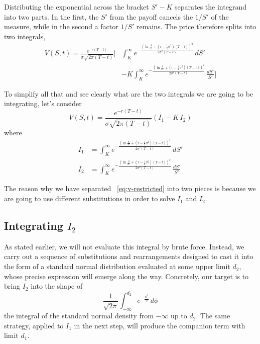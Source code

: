 \documentclass[a4paper,12pt]{article}
\numberwithin{equation}{section}
\begin{document}
Distributing the exponential across the bracket $S'-K$ separates the integrand
into two parts. In the first, the $S'$ from the payoff cancels the $1/S'$ of the
measure, while in the second a factor $1/S'$ remains. The price therefore splits
into two integrals,
\begin{equation}\label{eq:v-split-1}
\begin{aligned}
  V(S,t) = \frac{e^{-r(T-t)}}{\sigma\sqrt{2\pi(T-t)}}\Bigg[
    &\int_{K}^{\infty}
      e^{-\frac{\left(\ln\frac{S}{S'} + \left(r - \frac{1}{2}\sigma^2\right)(T-t)\right)^2}{2\sigma^2(T-t)}}
      \,dS' \\
    &- K\int_{K}^{\infty}
      e^{-\frac{\left(\ln\frac{S}{S'} + \left(r - \frac{1}{2}\sigma^2\right)(T-t)\right)^2}{2\sigma^2(T-t)}}
      \,\frac{dS'}{S'} \Bigg]
\end{aligned}
\end{equation}

To simplify all that and see clearly what are the two integrals we are going to be integrating, let's consider 
\begin{equation}\label{eq:v-split-2}
  V(S,t) = \frac{e^{-r(T-t)}}{\sigma\sqrt{2\pi(T-t)}}\left( I_1 - K\,I_2 \right)
\end{equation}
where
\begin{align}
  I_1 &= \int_{K}^{\infty}
    e^{-\frac{\left(\ln\frac{S}{S'} + \left(r - \frac{1}{2}\sigma^2\right)(T-t)\right)^2}{2\sigma^2(T-t)}}
    \,dS' \label{eq:I1}\\[6pt]
  I_2 &= \int_{K}^{\infty}
    e^{-\frac{\left(\ln\frac{S}{S'} + \left(r - \frac{1}{2}\sigma^2\right)(T-t)\right)^2}{2\sigma^2(T-t)}}
    \,\frac{dS'}{S'} \label{eq:I2}
\end{align}

The reason why we have separated ~\eqref{eq:v-restricted} into two pieces is because we are going to use different substitutions in order to solve $I_1$ and $I_2$.

\subsection[Integrating I2]{Integrating $I_2$}

As stated earlier, we will not evaluate this integral by brute force. Instead, we
carry out a sequence of substitutions and rearrangements designed to cast it into
the form of a standard normal distribution evaluated at some upper limit $d_2$,
whose precise expression will emerge along the way. Concretely, our target is to
bring $I_2$ into the shape of
\begin{equation}\label{eq:target-d2}
  \frac{1}{\sqrt{2\pi}}\int_{-\infty}^{d_2} e^{-\frac{\phi^2}{2}}\,d\phi 
\end{equation}
the integral of the standard normal density from $-\infty$ up to $d_2$. The same strategy, applied to $I_1$ in the next step, will produce the companion term with
limit $d_1$.
\end{document}
